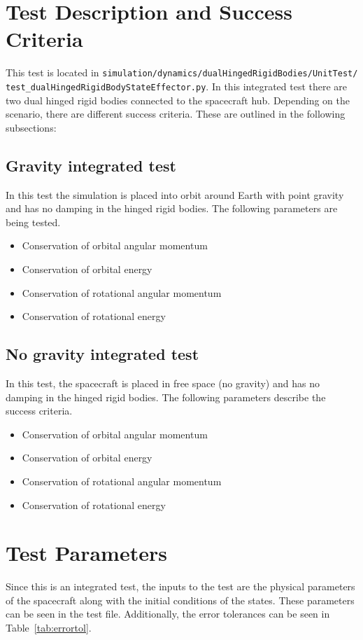 \section{Test Description and Success Criteria}
This test is located in \texttt{simulation/dynamics/dualHingedRigidBodies/UnitTest/\newline
test\_dualHingedRigidBodyStateEffector.py}. In this integrated test there are two dual hinged rigid bodies connected to the spacecraft hub.  Depending on the scenario, there are different success criteria. These are outlined in the following subsections:
\subsection{Gravity integrated test}
In this test the simulation is placed into orbit around Earth with point gravity and has no damping in the hinged rigid bodies. The following parameters are being tested. 
\begin{itemize}
	\item Conservation of orbital angular momentum
	\item Conservation of orbital energy
	\item Conservation of rotational angular momentum
	\item Conservation of rotational energy
\end{itemize}

\subsection{No gravity integrated test}
In this test, the spacecraft is placed in free space (no gravity) and has no damping in the hinged rigid bodies. The following parameters describe the success criteria.
\begin{itemize}
\item Conservation of orbital angular momentum
\item Conservation of orbital energy
\item Conservation of rotational angular momentum
\item Conservation of rotational energy
\end{itemize}

\section{Test Parameters}

Since this is an integrated test, the inputs to the test are the physical parameters of the spacecraft along with the initial conditions of the states. These parameters can be seen in the test file. Additionally, the error tolerances can be seen in Table~\ref{tab:errortol}.

